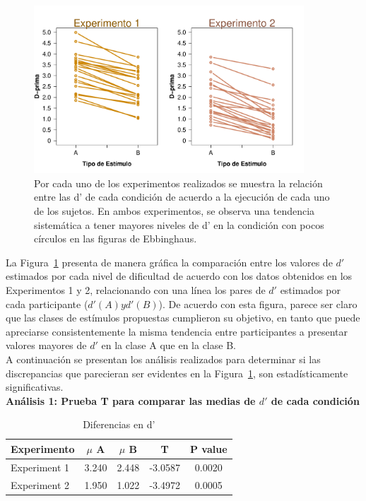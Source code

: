 \begin{figure}[th]
\centering
\includegraphics[width=0.90\textwidth]{Figures/Diff_D_E1yE2}
\caption[Diferencias entre las $d'$ de los niveles de dificultad propuestos]{Por cada uno de los experimentos realizados se muestra la relación entre las d' de cada condición de acuerdo a la ejecución de cada uno de los sujetos. En ambos experimentos, se observa una tendencia sistemática a tener mayores niveles de d' en la condición con pocos círculos en las figuras de Ebbinghaus.}
\label{fig:Diff_D}
\end{figure}

La Figura~\ref{fig:Diff_D} presenta de manera gráfica la comparación entre los valores de $d'$ estimados por cada nivel de dificultad de acuerdo con los datos obtenidos en los Experimentos 1 y 2, relacionando con una línea los pares de $d'$ estimados por cada participante ($d'(A) y d'(B)$). De acuerdo con esta figura, parece ser claro que las clases de estímulos propuestas cumplieron su objetivo, en tanto que puede apreciarse consistentemente la misma tendencia entre participantes a presentar valores mayores de $d'$ en la clase A que en la clase B.\\

A continuación se presentan los análisis realizados para determinar si las discrepancias que parecieran ser evidentes en la Figura~\ref{fig:Diff_D}, son estadísticamente significativas.\\

\textbf{Análisis 1: Prueba T para comparar las medias de $d'$ de cada condición}

\begin{table}
\caption[Prueba T para evaluar diferencias en las medias de d' entre las condiciones]{Diferencias en d'}
\label{Tabla_t-HitsyFA}
\centering
\begin{tabular}{l | c c c c}
\toprule
\textbf{Experimento} & \textbf{$\mu$ A} & \textbf{$\mu$ B} & \textbf{T}  & \textbf{P value}\\
\midrule
Experiment 1 & 3.240 & 2.448 & -3.0587 & 0.0020 \\
Experiment 2 & 1.950 & 1.022 & -3.4972 & 0.0005 \\
\bottomrule
\end{tabular}
\end{table}


